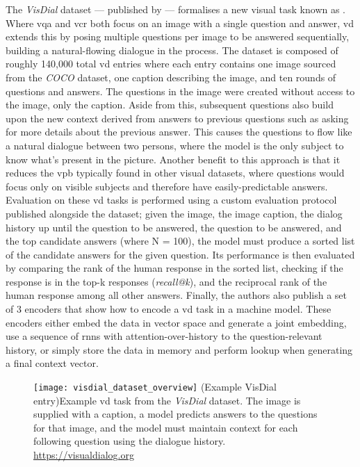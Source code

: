 The \textit{VisDial} dataset --- published by \citeauthor{das_visual_2019} \cite{das_visual_2019} --- formalises a new visual task known as .
Where \gls{vqa} and \gls{vcr} both focus on an image with a single question and answer, \gls{vd} extends this by posing multiple questions per image to be answered sequentially, building a natural-flowing dialogue in the process.
The dataset is composed of roughly 140,000 total \gls{vd} entries where each entry contains one image sourced from the \textit{COCO} dataset\cite{lin_microsoft_2015}, one caption describing the image, and ten rounds of questions and answers.
The questions in the image were created without access to the image, only the caption.
Aside from this, subsequent questions also build upon the new context derived from answers to previous questions such as asking for more details about the previous answer.
This causes the questions to flow like a natural dialogue between two persons, where the model is the only subject to know what's present in the picture.
Another benefit to this approach is that it reduces the \gls{vpb} typically found in other visual datasets, where questions would focus only on visible subjects and therefore have easily-predictable answers.
Evaluation on these \gls{vd} tasks is performed using a custom evaluation protocol published alongside the dataset; given the image, the image caption, the dialog history up until the question to be answered, the question to be answered, and the top candidate answers (where N = 100), the model must produce a sorted list of the candidate answers for the given question.
Its performance is then evaluated by comparing the rank of the human response in the sorted list, checking if the response is in the top-k responses (\textit{recall@k}), and the reciprocal rank of the human response among all other answers.
Finally, the authors also publish a set of 3 encoders that show how to encode a \gls{vd} task in a machine model.
These encoders either embed the data in vector space and generate a joint embedding, use a sequence of \glspl{rnn} with attention-over-history to the question-relevant history, or simply store the data in memory and perform lookup when generating a final context vector.

\begin{figure}[htbp]
    \centering
    \texttt{[image: visdial\_dataset\_overview]}
    \captionsource(Example VisDial entry){Example \gls{vd} task from the \textit{VisDial} dataset. The image is supplied with a caption, a model predicts answers to the questions for that image, and the model must maintain context for each following question using the dialogue history. \label{fig:visdial_question_answer}}{\url{https://visualdialog.org}}
\end{figure}

